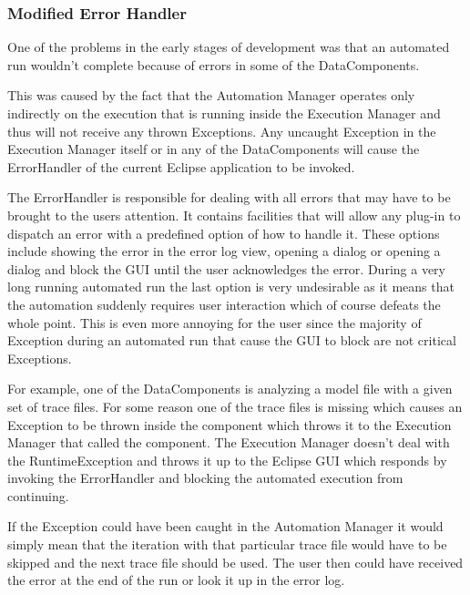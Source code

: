 \subsubsection{Modified Error Handler}
One of the problems in the early stages of development was that an automated run wouldn't complete
because of errors in some of the DataComponents.

This was caused by the fact that the Automation Manager operates only indirectly on the execution
that is running inside the Execution Manager and thus will not receive any thrown Exceptions.
Any uncaught Exception in the Execution Manager itself or in any of the DataComponents will
cause the ErrorHandler of the current Eclipse application to be invoked.

The ErrorHandler is responsible for dealing with all errors that may have to be brought
to the users attention. It contains facilities that will allow any plug-in to dispatch an
error with a predefined option of how to handle it. These options include showing the error
in the error log view, opening a dialog or opening a dialog and block the \ac{GUI} until the user
acknowledges the error. During a very long running automated run the last option is very
undesirable as it means that the automation suddenly requires user interaction which of course
defeats the whole point. This is even more annoying for the user since the majority of
Exception during an automated run that cause the \ac{GUI} to block are not critical Exceptions.

For example, one of the DataComponents is analyzing a model file with a given set of trace files.
For some reason one of the trace files is missing which causes an Exception to be thrown inside
the component which throws it to the Execution Manager that called the component. The Execution
Manager doesn't deal with the RuntimeException and throws it up to the Eclipse \ac{GUI} which
responds by invoking the ErrorHandler and blocking the automated execution from continuing. 

If the Exception could have been caught in the Automation Manager it would simply mean that
the iteration with that particular trace file would have to be skipped and the next trace file
should be used. The user then could have received the error at the end of the run or look it up
in the error log.

